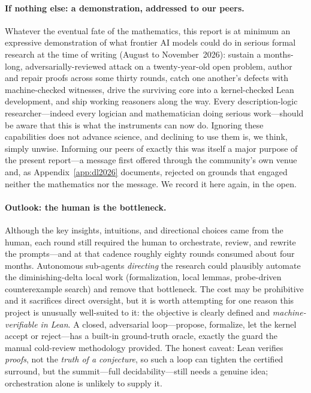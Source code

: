 \documentclass[11pt]{article}
\theoremstyle{plain}
\theoremstyle{definition}
\begin{document}
\paragraph{If nothing else: a demonstration, addressed to our peers.}
Whatever the eventual fate of the mathematics, this report is at minimum an
expressive demonstration of what frontier AI models could do in serious
formal research at the time of writing (August to November~2026): sustain a months-long,
adversarially-reviewed attack on a twenty-year-old open problem, author and
repair proofs across some thirty rounds, catch one another's defects with
machine-checked witnesses, drive the surviving core into a kernel-checked
Lean development, and ship working reasoners along the way.
Every description-logic researcher---indeed every logician and
mathematician doing serious work---should be aware that this is what the
instruments can now do. Ignoring these capabilities does not advance
science, and declining to use them is, we think, simply unwise. Informing
our peers of exactly this was itself a major purpose of the present
report---a message first offered through the community's own venue and, as
Appendix~\ref{app:dl2026} documents, rejected on grounds that engaged
neither the mathematics nor the message. We record it here again, in the
open.

\paragraph{Outlook: the human is the bottleneck.} Although the key
insights, intuitions, and directional choices came from the human, each
round still required the human to orchestrate, review, and rewrite the
prompts---and at that cadence roughly eighty rounds consumed about four
months. Autonomous sub-agents \emph{directing} the research could
plausibly automate the diminishing-delta local work (formalization, local
lemmas, probe-driven counterexample search) and remove that bottleneck.
The cost may be prohibitive and it sacrifices direct oversight, but it is
worth attempting for one reason this project is unusually well-suited to
it: the objective is clearly defined and \emph{machine-verifiable in
Lean}. A closed, adversarial loop---propose, formalize, let the kernel
accept or reject---has a built-in ground-truth oracle, exactly the guard
the manual cold-review methodology provided. The honest caveat: Lean
verifies \emph{proofs}, not the \emph{truth of a conjecture}, so such a
loop can tighten the certified surround, but the summit---full
decidability---still needs a genuine idea; orchestration alone is unlikely
to supply it.
\end{document}
